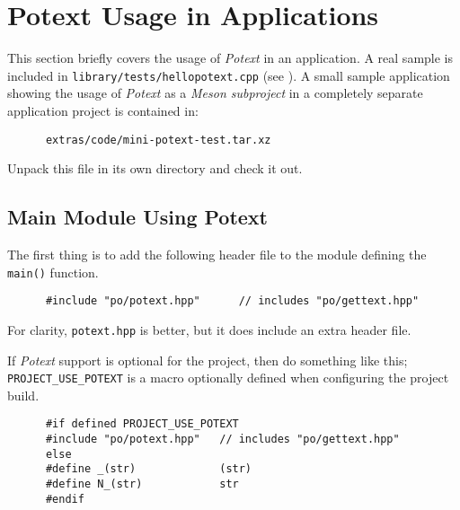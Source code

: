 %
%
%

\section{Potext Usage in Applications}
\label{subsec:potext_usage}

   This section briefly covers the usage of \textsl{Potext} in an
   application.
   A real sample is included in \texttt{library/tests/hellopotext.cpp}
   (see ).
   A small sample application showing the usage of
   \textsl{Potext} as a \textsl{Meson subproject} in a completely
   separate application project is
   contained in:

   \begin{verbatim}
      extras/code/mini-potext-test.tar.xz
   \end{verbatim}

   Unpack this file in its own directory and check it out.

\subsection{Main Module Using Potext}
\label{subsubsec:potext_usage_main}

   The first thing is to add the following header file
   to the module defining the \texttt{main()} function.

   \begin{verbatim}
      #include "po/potext.hpp"      // includes "po/gettext.hpp"
   \end{verbatim}

   For clarity, \texttt{potext.hpp} is better, but it does include
   an extra header file.

   If \textsl{Potext} support is optional for the project, then do
   something like this; \texttt{PROJECT\_USE\_POTEXT}
   is a macro optionally defined when configuring the project build.

   \begin{verbatim}
      #if defined PROJECT_USE_POTEXT
      #include "po/potext.hpp"   // includes "po/gettext.hpp"
      else
      #define _(str)             (str)
      #define N_(str)            str
      #endif
   \end{verbatim}

